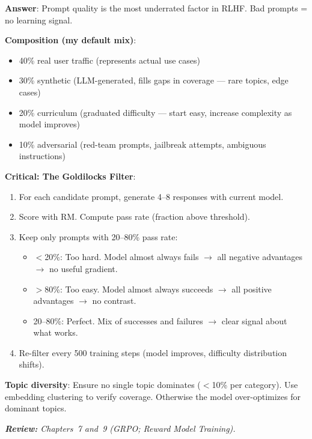 \begin{questionbox}
\textbf{Answer}: Prompt quality is the most underrated factor in RLHF. Bad prompts = no learning signal.

\textbf{Composition (my default mix)}:

\begin{itemize}
  \item 40\% real user traffic (represents actual use cases)
  \item 30\% synthetic (LLM-generated, fills gaps in coverage --- rare topics, edge cases)
  \item 20\% curriculum (graduated difficulty --- start easy, increase complexity as model improves)
  \item 10\% adversarial (red-team prompts, jailbreak attempts, ambiguous instructions)
\end{itemize}

\textbf{Critical: The Goldilocks Filter}:

\begin{enumerate}
  \item For each candidate prompt, generate 4--8 responses with current model.
  \item Score with RM. Compute pass rate (fraction above threshold).
  \item Keep only prompts with 20--80\% pass rate:

\begin{itemize}
  \item $<$20\%: Too hard. Model almost always fails $\rightarrow$ all negative advantages $\rightarrow$ no useful gradient.
  \item $>$80\%: Too easy. Model almost always succeeds $\rightarrow$ all positive advantages $\rightarrow$ no contrast.
  \item 20--80\%: Perfect. Mix of successes and failures $\rightarrow$ clear signal about what works.
\end{itemize}
  \item Re-filter every 500 training steps (model improves, difficulty distribution shifts).
\end{enumerate}

\textbf{Topic diversity}: Ensure no single topic dominates ($<$10\% per category). Use embedding clustering to verify coverage. Otherwise the model over-optimizes for dominant topics.

\emph{\textbf{Review:} Chapters~7 and~9 (GRPO; Reward Model Training).}
\end{questionbox}

